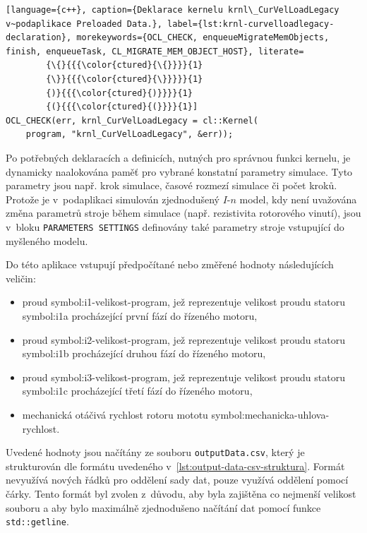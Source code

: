 \documentclass[a4paper, twoside, 11pt]{article}
\begin{document}
	   \begin{lstlisting}[language={c++}, caption={Deklarace kernelu krnl\_CurVelLoadLegacy v~podaplikace Preloaded Data.}, label={lst:krnl-curvelloadlegacy-declaration}, morekeywords={OCL_CHECK, enqueueMigrateMemObjects, finish, enqueueTask, CL_MIGRATE_MEM_OBJECT_HOST}, literate=
		{\{}{{{\color{ctured}{\{}}}}{1}
		{\}}{{{\color{ctured}{\}}}}}{1}
		{)}{{{\color{ctured}{)}}}}{1}
		{(}{{{\color{ctured}{(}}}}{1}]
OCL_CHECK(err, krnl_CurVelLoadLegacy = cl::Kernel(
	program, "krnl_CurVelLoadLegacy", &err));
\end{lstlisting}
	Po potřebných deklaracích a definicích, nutných pro správnou funkci kernelu, je dynamicky naalokována paměť pro vybrané konstatní parametry simulace. Tyto parametry jsou např. krok simulace, časové rozmezí simulace či počet kroků. Protože je v~podaplikaci simulován zjednodušený $I$-$n$ model, kdy není uvažována změna parametrů stroje během simulace (např. rezistivita rotorového vinutí), jsou v~bloku \texttt{PARAMETERS SETTINGS} definovány také parametry stroje vstupující do myšleného modelu.\par
	Do této aplikace vstupují předpočítané nebo změřené hodnoty následujících veličin:
	\begin{itemize}
		\item proud \gls{symbol:i1-velikost-program}, jež reprezentuje velikost proudu statoru \gls{symbol:i1a} procházející první fází do řízeného motoru,
		\item proud \gls{symbol:i2-velikost-program}, jež reprezentuje velikost proudu statoru \gls{symbol:i1b} procházející druhou fází do řízeného motoru,
		\item proud \gls{symbol:i3-velikost-program}, jež reprezentuje velikost proudu statoru \gls{symbol:i1c} procházející třetí fází do řízeného motoru,
		\item mechanická otáčivá rychlost rotoru mototu \gls{symbol:mechanicka-uhlova-rychlost}.
	\end{itemize}
	Uvedené hodnoty jsou načítány ze souboru \texttt{outputData.csv}, který je strukturován dle formátu uvedeného v~\ref{lst:output-data-csv-struktura}. Formát nevyužívá nových řádků pro oddělení sady dat, pouze využívá oddělení pomocí čárky. Tento formát byl zvolen z~důvodu, aby byla zajištěna co nejmenší velikost souboru a aby bylo maximálně zjednodušeno načítání dat pomocí funkce \texttt{std::getline}.\par
\end{document}
